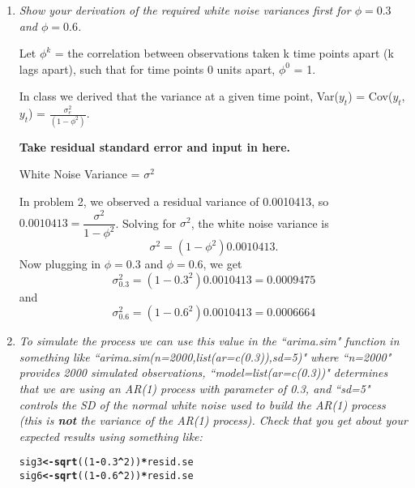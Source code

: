 \documentclass[11pt]{article}\usepackage[]{graphicx}\usepackage[]{color}
\makeatletter
\newcommand{\hlnum}[1]{\textcolor[rgb]{0,0,0}{#1}}%
\newcommand{\hlopt}[1]{\textcolor[rgb]{0,0,0}{\textbf{#1}}}%
\newcommand{\hlstd}[1]{\textcolor[rgb]{0,0,0}{#1}}%
\newcommand{\hlkwb}[1]{\textcolor[rgb]{0,0,0}{\textbf{#1}}}%
\newcommand{\hlkwd}[1]{\textcolor[rgb]{0,0,0}{\textbf{#1}}}%
\newenvironment{kframe}{%
 \def\at@end@of@kframe{}%
 \ifinner\ifhmode%
  \def\at@end@of@kframe{\end{minipage}}%
  \begin{minipage}{\columnwidth}%
 \fi\fi%
 \def\FrameCommand##1{\hskip\@totalleftmargin \hskip-\fboxsep
 \colorbox{shadecolor}{##1}\hskip-\fboxsep
     \hskip-\linewidth \hskip-\@totalleftmargin \hskip\columnwidth}%
 \MakeFramed {\advance\hsize-\width
   \@totalleftmargin\z@ \linewidth\hsize
   \@setminipage}}%
 {\par\unskip\endMakeFramed%
 \at@end@of@kframe}
\newenvironment{knitrout}{}{} %
\makeatother
\begin{document}
\begin{enumerate}
\begin{enumerate}
\item%
{\it Show your derivation of the required white noise variances first for $\phi=0.3$ and $\phi=0.6$.}

Let $\phi^{k}$ = the correlation between observations taken k time points apart (k lags apart), such that for time points 0 units apart, $\phi^{0}$ = 1.

In class we derived that the variance at a given time point, Var($y_{t}$) = Cov($y_{t}$,$y_{t}$) = $\frac{\sigma^2_{e}}{(1-\phi^2)}$.

{\bf Take residual standard error and input in here.}

White Noise Variance = $\sigma^2$

In problem 2, we observed a residual variance of 0.0010413, so $0.0010413 = \dfrac{\sigma^2}{1-\phi^2}$. Solving for $\sigma^2$, the white noise variance is
$$
\sigma^2 = (1-\phi^2) 0.0010413.
$$
Now plugging in $\phi=0.3$ and $\phi=0.6$, we get
$$\sigma^2_{0.3} = (1-0.3^2) 0.0010413 = 0.0009475$$
and
$$\sigma^2_{0.6} = (1-0.6^2) 0.0010413 = 0.0006664$$

\item%
{\it To simulate the process we can use this value in the ``arima.sim" function in something like ``arima.sim(n=2000,list(ar=c(0.3)),sd=5)" where ``n=2000" provides 2000 simulated observations, ``model=list(ar=c(0.3))" determines that we are using an AR(1) process with parameter of 0.3, and ``sd=5" controls the SD of the normal white noise used to build the AR(1) process (this is {\bf not} the variance of the AR(1) process). Check that you get about your expected results using something like:}


\begin{knitrout}\footnotesize
{}\color{fgcolor}\begin{kframe}
\begin{alltt}
\hlstd{sig3} \hlkwb{<-} \hlkwd{sqrt}\hlstd{((}\hlnum{1}\hlopt{-}\hlnum{0.3}\hlopt{^}\hlnum{2}\hlstd{))} \hlopt{*} \hlstd{resid.se}
\hlstd{sig6} \hlkwb{<-} \hlkwd{sqrt}\hlstd{((}\hlnum{1}\hlopt{-}\hlnum{0.6}\hlopt{^}\hlnum{2}\hlstd{))} \hlopt{*} \hlstd{resid.se}


\end{alltt}
\end{kframe}
\end{knitrout}
\end{enumerate}
\end{enumerate}
\end{document}
